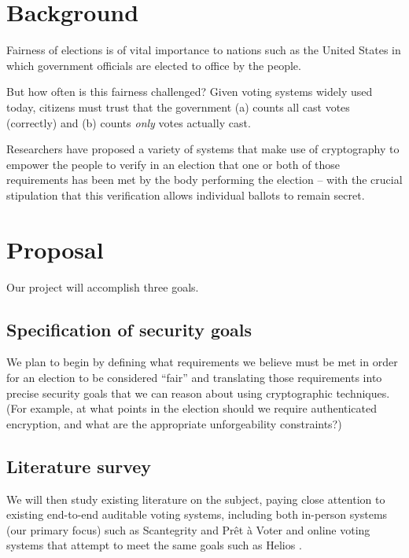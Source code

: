 \documentclass[10pt]{article}
\begin{document}
	\begin{multicols}{2}

		\section{Background}

			Fairness of elections is of vital importance to nations such as the United States in which
			government officials are elected to office by the people.

			But how often is this fairness challenged? Given voting systems widely used today, citizens
			must trust that the government (a) counts all cast votes (correctly) and (b) counts
			\emph{only} votes actually cast.

			Researchers have proposed a variety of systems that make use of cryptography to empower the
			people to verify in an election that one or both of those requirements has been met by the
			body performing the election -- with the crucial stipulation that this verification allows
			individual ballots to remain secret.

		\section{Proposal}

			Our project will accomplish three goals.

			\subsection{Specification of security goals}

				We plan to begin by defining what requirements we believe must be met in order for an
				election to be considered ``fair'' and translating those requirements into precise security
				goals that we can reason about using cryptographic techniques. (For example, at what points
				in the election should we require authenticated encryption, and what are the appropriate
				unforgeability constraints?)

			\subsection{Literature survey}

				We will then study existing literature on the subject, paying close attention to existing
				end-to-end auditable voting systems, including both in-person systems (our primary focus)
				such as Scantegrity \cite{scantegrity} and Pr\^{e}t \`{a} Voter \cite{preta} and online
				voting systems that attempt to meet the same goals such as Helios \cite{helios}.


\end{multicols}
\end{document}
